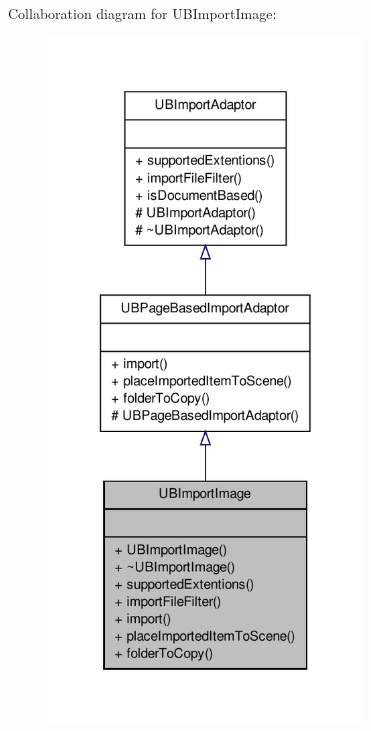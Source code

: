 Collaboration diagram for U\-B\-Import\-Image\-:
\nopagebreak
\begin{figure}[H]
\begin{center}
\leavevmode
\includegraphics[width=236pt]{de/d2c/class_u_b_import_image__coll__graph}
\end{center}
\end{figure}
